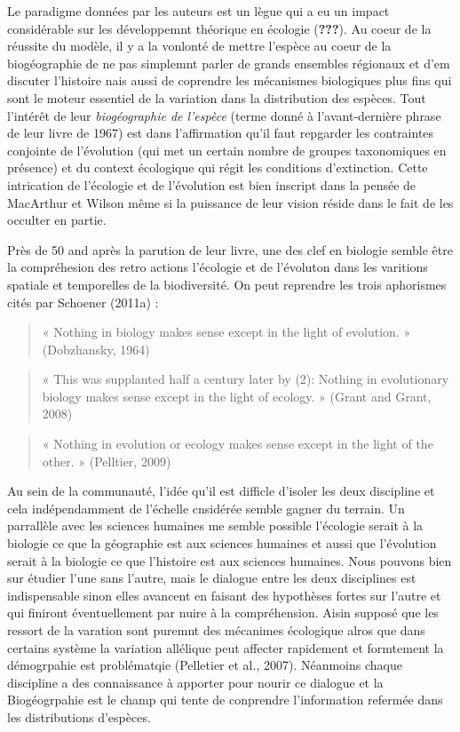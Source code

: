 Le paradigme données par les auteurs est un lègue qui a eu un impact
considérable sur les développemnt théorique en écologie
({\textbf{???}}). Au coeur de la réussite du modèle, il y a la vonlonté
de mettre l'espèce au coeur de la biogéographie de ne pas simplemnt
parler de grands ensembles régionaux et d'em discuter l'histoire nais
aussi de coprendre les mécanismes biologiques plus fins qui sont le
moteur essentiel de la variation dans la distribution des espèces. Tout
l'intérêt de leur \emph{biogéographie de l'espèce} (terme donné à
l'avant-dernière phrase de leur livre de 1967) est dans l'affirmation
qu'il faut repgarder les contraintes conjointe de l'évolution (qui met
un certain nombre de groupes taxonomiques en présence) et du context
écologique qui régit les conditions d'extinction. Cette intrication de
l'écologie et de l'évolution est bien inscript dans la pensée de
MacArthur et Wilson même si la puissance de leur vision réside dans le
fait de les occulter en partie.

Près de 50 and après la parution de leur livre, une des clef en biologie
semble être la compréhesion des retro actions l'écologie et de
l'évoluton dans les varitions spatiale et temporelles de la
biodiversité. On peut reprendre les trois aphorismes cités par Schoener
(2011a) :

\begin{quote}
« Nothing in biology makes sense except in the light of evolution. »
(Dobzhansky, 1964)
\end{quote}

\begin{quote}
« This was supplanted half a century later by (2): Nothing in
evolutionary biology makes sense except in the light of ecology. »
(Grant and Grant, 2008)
\end{quote}

\begin{quote}
« Nothing in evolution or ecology makes sense except in the light of the
other. » (Pelltier, 2009)
\end{quote}

Au sein de la communauté, l'idée qu'il est difficle d'isoler les deux
discipline et cela indépendamment de l'échelle cnsidérée semble gagner
du terrain. Un parrallèle avec les sciences humaines me semble possible
l'écologie serait à la biologie ce que la géographie est aux sciences
humaines et aussi que l'évolution serait à la biologie ce que l'histoire
est aux sciences humaines. Nous pouvons bien sur étudier l'une sans
l'autre, mais le dialogue entre les deux disciplines est indispensable
sinon elles avancent en faisant des hypothèses fortes sur l'autre et qui
finiront éventuellement par nuire à la compréhension. Aisin supposé que
les ressort de la varation sont puremnt des mécanimes écologique alros
que dans certains système la variation allélique peut affecter
rapidement et formtement la démogrpahie est problématqie (Pelletier et
al., 2007). Néanmoins chaque discipline a des connaissance à apporter
pour nourir ce dialogue et la Biogéogrpahie est le champ qui tente de
conprendre l'information refermée dans les distributions d'espèces.

